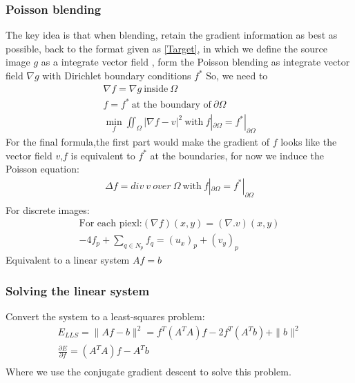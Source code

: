 \documentclass[letterpaper,12pt]{article}
\begin{document}
\subsubsection{Poisson blending}
The key idea is that when blending, retain the gradient information as best as possible, back to the format given as \ref{Target}, in which we define the source image $g$ as a integrate vector field , form the Poisson blending as integrate vector field $\nabla g$ with Dirichlet boundary conditions $f^*$
\newline
So, we need to 
\begin{equation*}
\begin{aligned}
\nabla f = \nabla g\ \text{inside}\ \Omega \\
f = f^*\ \text{at the boundary of}\ \partial \Omega \\
\min_{f} \iint_{\Omega}|\nabla f - v|^2\ \text{with}\ f|_{\partial \Omega}=f^*|_{\partial \Omega}
\end{aligned}
\end{equation*}
For the final formula,the first part would make the gradient of $f$ looks like the vector field $v$,$f$ is equivalent to $f^*$ at the boundaries, for now we induce the Poisson equation: 
\begin{equation*}
\begin{aligned}
\Delta f = div\ v\ over\ \Omega\ \text{with}\ f|_{\partial \Omega}=f^*|_{\partial \Omega} \\
\end{aligned}
\end{equation*}
For discrete images:
\begin{equation*}
\begin{aligned}
\text{For each piexl:}
(\nabla f)(x,y) = (\nabla . v)(x,y)\\
-4f_p+\sum_{q \in N_p}f_q = (u_x)_p+(v_y)_p
\end{aligned}
\end{equation*}
Equivalent to a linear system $Af = b$
\subsubsection{Solving the linear system}
Convert the system to a least-squares problem:
\begin{equation*}
\begin{aligned}
E_{LLS} = \|Af-b\|^2 = f^T(A^TA)f-2f^T(A^Tb)+\|b\|^2 \\
\frac{\partial E}{\partial f}=(A^TA)f-A^Tb\\
\end{aligned}
\end{equation*}
Where we use the conjugate gradient descent to solve this problem.
\end{document}
